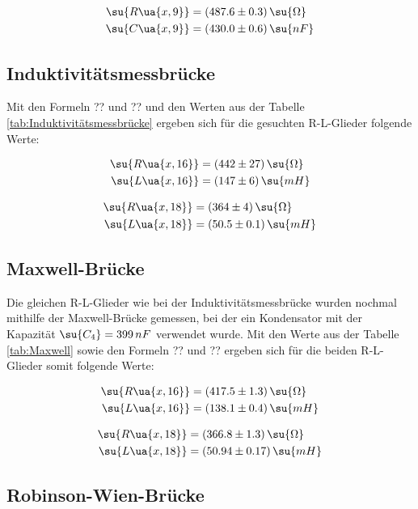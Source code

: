 \begin{align}
  \su{R\ua{x,9}} &= (487.6 \pm 0.3) \, \su{\Omega} \\
  \su{C\ua{x,9}} &= (430.0 \pm 0.6) \, \su{nF}
\end{align}

\subsection{Induktivitätsmessbrücke}

Mit den Formeln ?? und ?? und den Werten aus der Tabelle \ref{tab:Induktivitätsmessbrücke}
ergeben sich für die gesuchten R-L-Glieder folgende Werte:

\begin{align}
  \su{R\ua{x,16}} &= (442 \pm 27) \, \su{\Omega} \\
  \su{L\ua{x,16}} &= (147 \pm 6) \, \su{mH}
\end{align}

\begin{align}
  \su{R\ua{x,18}} &= (364 \pm 4) \, \su{\Omega}  \\
  \su{L\ua{x,18}} &= (50.5 \pm 0.1) \, \su{mH}
\end{align}

\subsection{Maxwell-Brücke}
Die gleichen R-L-Glieder wie bei der Induktivitätsmessbrücke wurden nochmal mithilfe
der Maxwell-Brücke gemessen, bei der ein Kondensator mit der Kapazität $\su{C_4} = 399 \, nF$
verwendet wurde. Mit den Werte aus der Tabelle \ref{tab:Maxwell}
sowie den Formeln ?? und ?? ergeben sich für die beiden R-L-Glieder somit folgende
Werte:

\begin{align}
  \su{R\ua{x,16}} &= (417.5 \pm 1.3) \, \su{\Omega} \\
  \su{L\ua{x,16}} &= (138.1 \pm 0.4) \, \su{mH}
\end{align}

\begin{align}
  \su{R\ua{x,18}} &= (366.8 \pm 1.3) \, \su{\Omega}  \\
  \su{L\ua{x,18}} &= (50.94 \pm 0.17) \, \su{mH}
\end{align}

\subsection{Robinson-Wien-Brücke}

